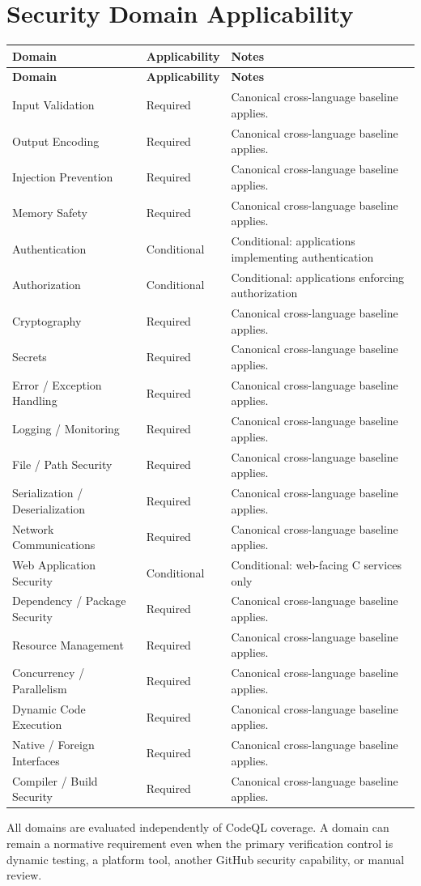 \documentclass[10pt,letterpaper]{article}
\begin{document}
\section{Security Domain Applicability}
\small
\setlength{\tabcolsep}{3pt}
\begin{longtable}{@{}P{1.8in}P{0.85in}P{3.75in}@{}}
\toprule
\textbf{Domain} & \textbf{Applicability} & \textbf{Notes}\\
\midrule
\endfirsthead
\toprule
\textbf{Domain} & \textbf{Applicability} & \textbf{Notes}\\
\midrule
\endhead
Input Validation & Required & Canonical cross-language baseline applies.\\
Output Encoding & Required & Canonical cross-language baseline applies.\\
Injection Prevention & Required & Canonical cross-language baseline applies.\\
Memory Safety & Required & Canonical cross-language baseline applies.\\
Authentication & Conditional & Conditional: applications implementing authentication\\
Authorization & Conditional & Conditional: applications enforcing authorization\\
Cryptography & Required & Canonical cross-language baseline applies.\\
Secrets & Required & Canonical cross-language baseline applies.\\
Error / Exception Handling & Required & Canonical cross-language baseline applies.\\
Logging / Monitoring & Required & Canonical cross-language baseline applies.\\
File / Path Security & Required & Canonical cross-language baseline applies.\\
Serialization / Deserialization & Required & Canonical cross-language baseline applies.\\
Network Communications & Required & Canonical cross-language baseline applies.\\
Web Application Security & Conditional & Conditional: web-facing C services only\\
Dependency / Package Security & Required & Canonical cross-language baseline applies.\\
Resource Management & Required & Canonical cross-language baseline applies.\\
Concurrency / Parallelism & Required & Canonical cross-language baseline applies.\\
Dynamic Code Execution & Required & Canonical cross-language baseline applies.\\
Native / Foreign Interfaces & Required & Canonical cross-language baseline applies.\\
Compiler / Build Security & Required & Canonical cross-language baseline applies.\\
\bottomrule
\end{longtable}
\normalsize
All domains are evaluated independently of CodeQL coverage. A domain can remain a normative requirement even when the primary verification control is dynamic testing, a platform tool, another GitHub security capability, or manual review.
\end{document}
